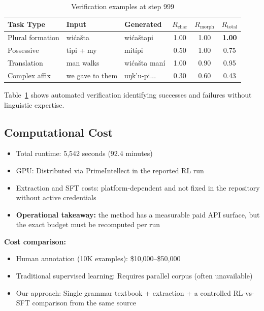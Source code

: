 \documentclass{article}
\newcommand{\Rchar}{R_{\text{char}}}
\newcommand{\Rmorph}{R_{\text{morph}}}
\newcommand{\Rtotal}{R_{\text{total}}}
\begin{document}
\begin{table}[t]
\centering
\caption{Verification examples at step 999}
\label{tab:verification_examples}
\small
\begin{tabular}{lllccc}
\toprule
\textbf{Task Type} & \textbf{Input} & \textbf{Generated} & $\Rchar$ & $\Rmorph$ & $\Rtotal$ \\
\midrule
Plural formation & wićašta & wićaštapi & 1.00 & 1.00 & \textbf{1.00} \\
Possessive & tipi + my & mitípi & 0.50 & 1.00 & 0.75 \\
Translation & man walks & wićašta maní & 1.00 & 0.90 & 0.95 \\
Complex affix & we gave to them & uŋk'u-pi... & 0.30 & 0.60 & 0.43 \\
\bottomrule
\end{tabular}
\end{table}

Table~\ref{tab:verification_examples} shows automated verification identifying successes and failures without linguistic expertise.

\subsection{Computational Cost}

\begin{itemize}
    \item Total runtime: 5,542 seconds (92.4 minutes)
    \item GPU: Distributed via PrimeIntellect in the reported RL run
    \item Extraction and SFT costs: platform-dependent and not fixed in the repository without active credentials
    \item \textbf{Operational takeaway:} the method has a measurable paid API surface, but the exact budget must be recomputed per run
\end{itemize}

\textbf{Cost comparison:}
\begin{itemize}
    \item Human annotation (10K examples): \$10,000--\$50,000
    \item Traditional supervised learning: Requires parallel corpus (often unavailable)
    \item Our approach: Single grammar textbook + extraction + a controlled RL-vs-SFT comparison from the same source
\end{itemize}
\end{document}
